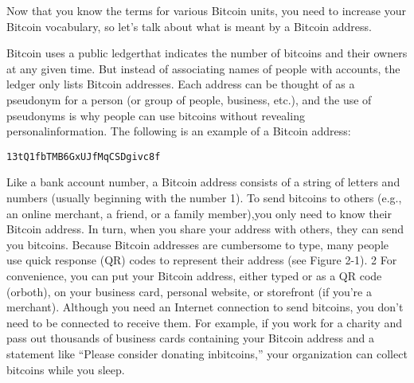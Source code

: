 \par Now that you know the terms for various Bitcoin units, you need to increase your Bitcoin vocabulary, so let’s talk about what is meant by a Bitcoin address.


\par Bitcoin uses a public ledgerthat indicates the number of bitcoins and their owners at any given time. But instead of associating names of people with accounts, the ledger only lists Bitcoin addresses. Each address can be thought of as a pseudonym for a person (or group of people, business, etc.), and the use of pseudonyms is why people can use bitcoins without revealing personalinformation. The following is an example of a Bitcoin address:

\par \texttt{13tQ1fbTMB6GxUJfMqCSDgivc8f}

\par Like a bank account number, a Bitcoin address consists of a string of letters and numbers (usually beginning with the number 1). To send bitcoins to others (e.g., an online merchant, a friend, or a family member),you only need to know their Bitcoin address. In turn, when you share your address with others, they can send you bitcoins. Because Bitcoin addresses are cumbersome to type, many people use quick response (QR) codes to represent their address (see Figure 2-1). 2 For convenience, you can put your Bitcoin address, either typed or as a QR code (orboth), on your business card, personal website, or storefront (if you’re a merchant). Although you need an Internet connection to send bitcoins, you don’t need to be connected to receive them. For example, if you work for a charity and pass out thousands of business cards containing your Bitcoin address and a statement like “Please consider donating inbitcoins,” your organization can collect bitcoins while you sleep.

